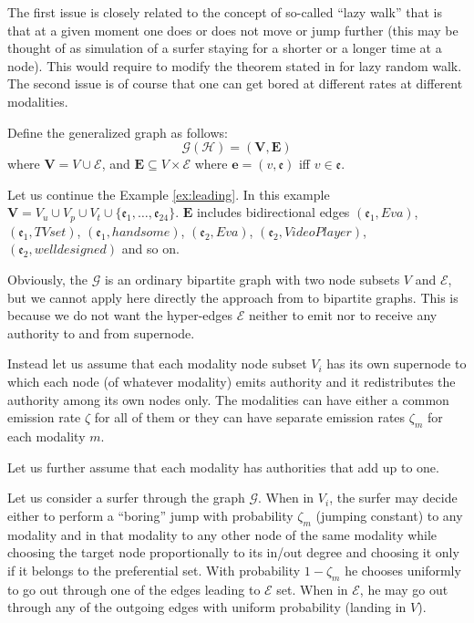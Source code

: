 \documentclass{fundam}
\newcommand{\HEM}{\mathcal{E}}
\newcommand{\hem}{\mathfrak{e}}
\newcommand{\HGM}{\mathcal{H}}
\newcommand{\N}{ V }
\newcommand{\n}{ v }
\newcommand{\GG}{\mathcal{G}}
\newcommand{\GE}{\mathbf{E}}
\newcommand{\Ge}{\mathbf{e}}
\newcommand{\GN}{\mathbf{V}}
\begin{document}
The first issue is closely related to the concept of   so-called ``lazy walk'' that is that at a given moment one does or does not move or jump further (this may be thought of as simulation of a surfer staying for a shorter or a longer time at a node). This would require  to modify the theorem stated in \cite{Bipartite:2016} for lazy random walk.
The second issue is of course that one can get bored at different rates at different modalities.

\medskip
Define the generalized graph as follows:
$$\GG(\HGM)=(\GN, \GE)$$
where $\GN=\N\cup \HEM$, and $\GE\subseteq \N\times \HEM$
where $\Ge=(\n,\hem)$ iff $\n \in \hem$.


\begin{example}%
    Let us continue the Example \ref{ex:leading}.
In this example $\GN=   \N_u\cup\N_p\cup\N_t\cup \{\hem_{1},\dots,\hem_{24}\}$.
$\GE$ includes bidirectional edges
$(\hem_1, Eva)$,  $(\hem_1, TVset)$, $(\hem_1, handsome)$,
$(\hem_2, Eva)$,   $(\hem_2,VideoPlayer)$,   $(\hem_2, welldesigned)$ and so on.
\end{example}%

Obviously, the $\GG$ is an ordinary bipartite graph with two node subsets $\N$ and $\HEM$, but we cannot apply here directly the  approach from \cite{Bipartite:2016} to bipartite graphs.
This is because we do not want the hyper-edges $\HEM$ neither to emit nor to receive any authority to and from supernode.

Instead let us assume that each modality node subset $\N_i$ has its own supernode to which each node (of whatever modality)  emits authority and it redistributes the authority among its own nodes only. The modalities can have either a  common emission rate $\zeta$ for all of them or they can have separate emission rates $\zeta_m$ for each modality $m$.

Let us further assume that each modality has authorities that add up to one.

Let us consider a surfer through the graph $\GG$.
When in $\N_i$, the surfer may decide
either to perform a ``boring'' jump with probability $\zeta_m$ (jumping constant) to any modality and in that modality to any other node of the same modality while choosing the target node proportionally to its in/out degree and choosing it only if it belongs to the preferential set.
With probability $1-\zeta_m$ he chooses uniformly to go out through one of the edges leading to $\HEM$ set. When in $\HEM$, he may go out through any of the outgoing edges with uniform probability (landing in $\N$).
\end{document}
